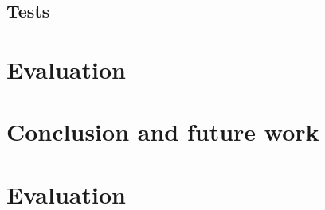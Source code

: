 \documentclass[12pt, a4paper]{article}
\begin{document}
\subsection{Tests}

\section{Evaluation}


\section{Conclusion and future work}




\nocite{methodology}
 
 
 
\appendix


\section{Evaluation}
\end{document}
